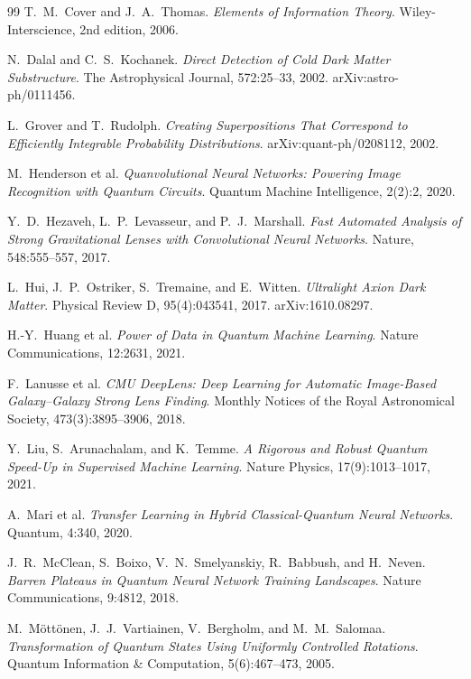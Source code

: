 \documentclass[10pt,letterpaper]{article}
\theoremstyle{plain}
\theoremstyle{definition}
\begin{document}
\begin{thebibliography}{99}
T.~M.~Cover and J.~A.~Thomas.
\textit{Elements of Information Theory}.
Wiley-Interscience, 2nd edition, 2006.

N.~Dalal and C.~S.~Kochanek.
\textit{Direct Detection of Cold Dark Matter Substructure}.
The Astrophysical Journal, 572:25--33, 2002. arXiv:astro-ph/0111456.

L.~Grover and T.~Rudolph.
\textit{Creating Superpositions That Correspond to Efficiently Integrable
Probability Distributions}.
arXiv:quant-ph/0208112, 2002.

M.~Henderson et al.
\textit{Quanvolutional Neural Networks: Powering Image Recognition with Quantum
Circuits}.
Quantum Machine Intelligence, 2(2):2, 2020.

Y.~D.~Hezaveh, L.~P.~Levasseur, and P.~J.~Marshall.
\textit{Fast Automated Analysis of Strong Gravitational Lenses with Convolutional
Neural Networks}.
Nature, 548:555--557, 2017.

L.~Hui, J.~P.~Ostriker, S.~Tremaine, and E.~Witten.
\textit{Ultralight Axion Dark Matter}.
Physical Review D, 95(4):043541, 2017. arXiv:1610.08297.

H.-Y.~Huang et al.
\textit{Power of Data in Quantum Machine Learning}.
Nature Communications, 12:2631, 2021.

F.~Lanusse et al.
\textit{CMU DeepLens: Deep Learning for Automatic Image-Based Galaxy--Galaxy
Strong Lens Finding}.
Monthly Notices of the Royal Astronomical Society, 473(3):3895--3906, 2018.

Y.~Liu, S.~Arunachalam, and K.~Temme.
\textit{A Rigorous and Robust Quantum Speed-Up in Supervised Machine Learning}.
Nature Physics, 17(9):1013--1017, 2021.

A.~Mari et al.
\textit{Transfer Learning in Hybrid Classical-Quantum Neural Networks}.
Quantum, 4:340, 2020.

J.~R.~McClean, S.~Boixo, V.~N.~Smelyanskiy, R.~Babbush, and H.~Neven.
\textit{Barren Plateaus in Quantum Neural Network Training Landscapes}.
Nature Communications, 9:4812, 2018.

M.~M\"{o}tt\"{o}nen, J.~J.~Vartiainen, V.~Bergholm, and M.~M.~Salomaa.
\textit{Transformation of Quantum States Using Uniformly Controlled Rotations}.
Quantum Information \& Computation, 5(6):467--473, 2005.


\end{thebibliography}
\end{document}
